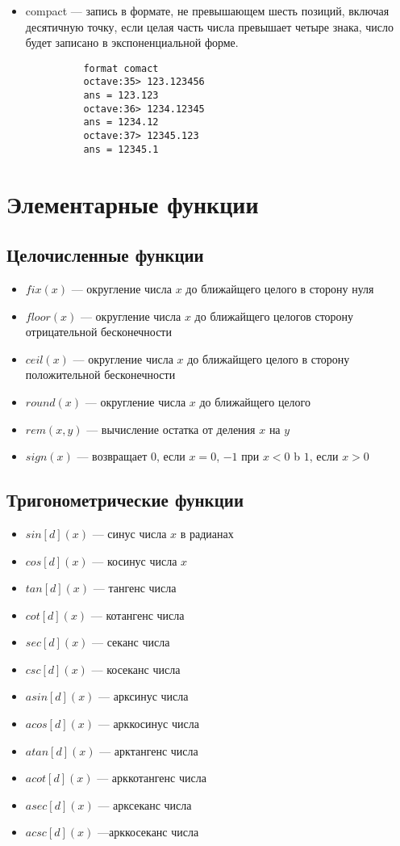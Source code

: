 \documentclass[12pt, a4paper,oneside]{book}
\begin{document}
\begin{itemize}
  \item{compact --- запись в формате, не превышающем шесть позиций, включая десятичную точку, если целая часть числа превышает четыре знака, число будет записано в экспоненциальной форме.}
        \begin{lstlisting}
          format comact
          octave:35> 123.123456
          ans = 123.123
          octave:36> 1234.12345
          ans = 1234.12
          octave:37> 12345.123
          ans = 12345.1
        \end{lstlisting}
\end{itemize}
\newpage

\section{Элементарные функции}
\subsection{Целочисленные функции}
\begin{itemize}
  \item{$fix(x)$ --- округление числа $x$ до ближайщего целого в сторону нуля}
  \item{$floor(x)$ --- округление числа $x$ до ближайщего целогов сторону отрицательной бесконечности}
  \item{$ceil(x)$ --- округление числа $x$ до ближайщего целого в сторону положительной бесконечности}
  \item{$round(x)$ --- округление числа $x$ до ближайщего целого}
  \item{$rem(x, y)$ --- вычисление остатка от деления $x$ на $y$}
  \item{$sign(x)$ --- возвращает $0$, если $x=0$, $-1$ при $x < 0$ b $1$, если $x > 0$}
\end{itemize}

\subsection{Тригонометрические функции}
\begin{itemize}
  \item{$sin[d](x)$ --- синус числа $x$ в радианах}
  \item{$cos[d](x)$ --- косинус числа $x$}
  \item{$tan[d](x)$ --- тангенс числа}
  \item{$cot[d](x)$ --- котангенс числа}
  \item{$sec[d](x)$ --- секанс числа}
  \item{$csc[d](x)$ --- косеканс числа}
  \item{$asin[d](x)$ --- арксинус числа}
  \item{$acos[d](x)$ --- арккосинус числа}
  \item{$atan[d](x)$ --- арктангенс числа}
  \item{$acot[d](x)$ --- арккотангенс числа}
  \item{$asec[d](x)$ --- арксеканс числа}
  \item{$acsc[d](x)$ ---арккосеканс числа}
\end{itemize}
\end{document}
